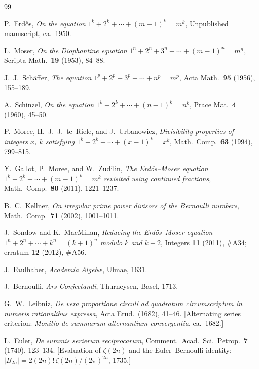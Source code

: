 \documentclass[12pt,a4paper]{article}
\theoremstyle{plain}
\theoremstyle{definition}
\begin{document}
\begin{thebibliography}{99}

P.~Erd\H{o}s,
\textit{On the equation $1^k + 2^k + \cdots + (m-1)^k = m^k$},
Unpublished manuscript, ca.\ 1950.

L.~Moser,
\textit{On the Diophantine equation $1^n + 2^n + 3^n + \cdots + (m-1)^n = m^n$},
Scripta Math.\ \textbf{19} (1953), 84--88.

J.~J.~Sch\"{a}ffer,
\textit{The equation $1^p + 2^p + 3^p + \cdots + n^p = m^p$},
Acta Math.\ \textbf{95} (1956), 155--189.

A.~Schinzel,
\textit{On the equation $1^k + 2^k + \cdots + (n-1)^k = n^k$},
Prace Mat.\ \textbf{4} (1960), 45--50.

P.~Moree, H.~J.~J.~te~Riele, and J.~Urbanowicz,
\textit{Divisibility properties of integers $x$, $k$ satisfying
$1^k + 2^k + \cdots + (x-1)^k = x^k$},
Math.\ Comp.\ \textbf{63} (1994), 799--815.

Y.~Gallot, P.~Moree, and W.~Zudilin,
\textit{The Erd\H{o}s--Moser equation $1^k + 2^k + \cdots + (m-1)^k = m^k$
revisited using continued fractions},
Math.\ Comp.\ \textbf{80} (2011), 1221--1237.

B.~C.~Kellner,
\textit{On irregular prime power divisors of the Bernoulli numbers},
Math.\ Comp.\ \textbf{71} (2002), 1001--1011.

J.~Sondow and K.~MacMillan,
\textit{Reducing the Erd\H{o}s--Moser equation $1^n + 2^n + \cdots + k^n =
(k+1)^n$ modulo $k$ and $k+2$},
Integers \textbf{11} (2011), \#A34; erratum \textbf{12} (2012), \#A56.

J.~Faulhaber,
\textit{Academia Algeb\ae},
Ulmae, 1631.

J.~Bernoulli,
\textit{Ars Conjectandi},
Thurneysen, Basel, 1713.

G.~W.~Leibniz,
\textit{De vera proportione circuli ad quadratum circumscriptum in numeris
rationalibus expressa},
Acta Erud.\ (1682), 41--46.
[Alternating series criterion: \textit{Monitio de summarum alternantium
convergentia}, ca.\ 1682.]

L.~Euler,
\textit{De summis serierum reciprocarum},
Comment.\ Acad.\ Sci.\ Petrop.\ \textbf{7} (1740), 123--134.
[Evaluation of $\zeta(2n)$ and the Euler--Bernoulli identity:
$|B_{2n}| = 2(2n)!\,\zeta(2n)/(2\pi)^{2n}$, 1735.]


\end{thebibliography}
\end{document}
